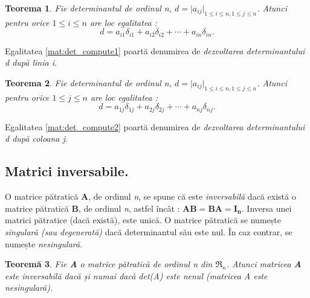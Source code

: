 \newtheorem{th_detcompute}{Teorema}
\begin{th_detcompute}
Fie determinantul de ordinul \textit{n}, $\mathit{d} = \vert a_{ij} 
\vert_{1 \leq i \leq n, 1 \leq j \leq n}$. Atunci pentru orice 
$1 \leq i \leq n$ are loc egalitatea :
\begin{equation}
\label{mat:det_compute1}
\mathit{d} = a_{i1}\delta_{i1} + a_{i2}\delta_{i2} + \cdots + a_{in}\delta_{in}.
\end{equation}
\end{th_detcompute}
Egalitatea \eqref{mat:det_compute1} poartă denumirea de \textit{dezvoltarea
determinantului d după linia i}.

\newtheorem{th_detcompute2}[th_detcompute]{Teorema}
\begin{th_detcompute2}
Fie determinantul de ordinul \textit{n}, $\mathit{d} = \vert a_{ij} 
\vert_{1 \leq i \leq n, 1 \leq j \leq n}$. Atunci pentru orice 
$1 \leq j \leq n$ are loc egalitatea :
\begin{equation}
\label{mat:det_compute2}
\mathit{d} = a_{1j}\delta_{1j} + a_{2j}\delta_{2j} + \cdots + a_{nj}\delta_{nj}.
\end{equation}
\end{th_detcompute2}
Egalitatea \eqref{mat:det_compute2} poartă denumirea de \textit{dezvoltarea
determinantului d după coloana j}.

\subsection{Matrici inversabile.}
\label{ch1:sec_matrix:sub_matrix_inverse}

O matrice pătratică \textbf{A}, de ordinul \textit{n}, se spune că este
\textit{inversabilă} dacă există o matrice pătratică \textbf{B}, de ordinul
\textit{n}, astfel încât : $\mathbf{AB = BA = I_{n}}$. Inversa unei matrici
pătratice (dacă există), este unică.
O matrice pătratică se numește \textit{singulară (sau degenerată)} dacă
determinantul său este nul. În caz contrar, se numește \textit{nesingulară}.

\newtheorem{th_matrixinverse}[th_detcompute]{Teoremă}
\label{theorem:matrix_inverse}
\begin{th_matrixinverse}
Fie \textbf{A} o matrice pătratică de ordinul \textit{n} din $\mathfrak{R}_{n}$.
Atunci matricea \textbf{A} este inversabilă dacă și numai dacă det(A) este nenul
(matricea A este nesingulară).
\end{th_matrixinverse}


